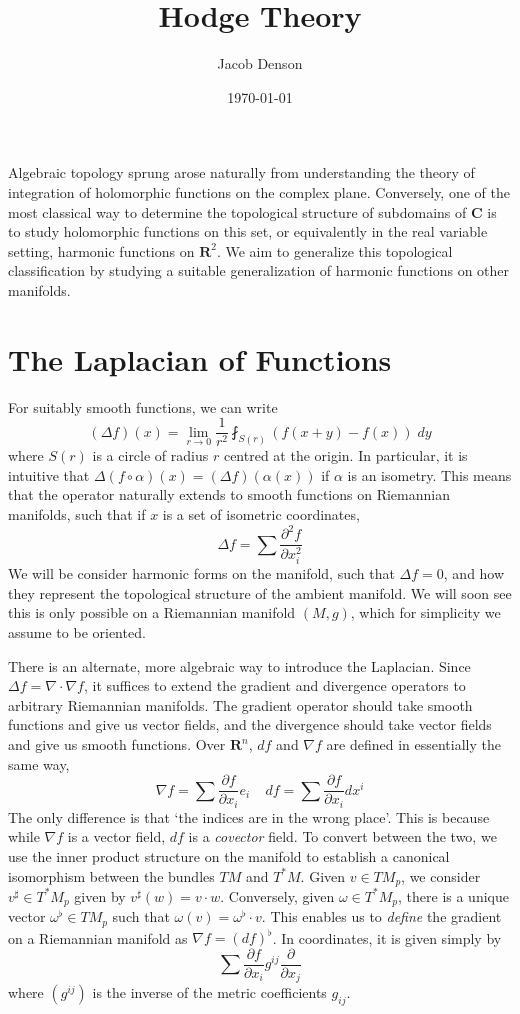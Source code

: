 \documentclass{article}
\title{Hodge Theory}
\author{Jacob Denson}
\date{\today}
\theoremstyle{plain}
\theoremstyle{remark}
\theoremstyle{definition}
\begin{document}
\maketitle

Algebraic topology sprung arose naturally from understanding the theory of integration of holomorphic functions on the complex plane. Conversely, one of the most classical way to determine the topological structure of subdomains of $\mathbf{C}$ is to study holomorphic functions on this set, or equivalently in the real variable setting, harmonic functions on $\mathbf{R}^2$. We aim to generalize this topological classification by studying a suitable generalization of harmonic functions on other manifolds.

\section{The Laplacian of Functions}

For suitably smooth functions, we can write
%
\[ (\Delta f)(x) = \lim_{r \to 0} \frac{1}{r^2} \fint_{S(r)} \left( f(x + y) - f(x) \right)\; dy \]
%
where $S(r)$ is a circle of radius $r$ centred at the origin. In particular, it is intuitive that $\Delta (f \circ \alpha)(x) = (\Delta f)(\alpha(x))$ if $\alpha$ is an isometry. This means that the operator naturally extends to smooth functions on Riemannian manifolds, such that if $x$ is a set of isometric coordinates,
%
\[ \Delta f = \sum \frac{\partial^2 f}{\partial x_i^2} \]
%
We will be consider harmonic forms on the manifold, such that $\Delta f = 0$, and how they represent the topological structure of the ambient manifold. We will soon see this is only possible on a Riemannian manifold $(M,g)$, which for simplicity we assume to be oriented.

There is an alternate, more algebraic way to introduce the Laplacian. Since $\Delta f = \nabla \cdot \nabla f$, it suffices to extend the gradient and divergence operators to arbitrary Riemannian manifolds. The gradient operator should take smooth functions and give us vector fields, and the divergence should take vector fields and give us smooth functions. Over $\mathbf{R}^n$, $df$ and $\nabla f$ are defined in essentially the same way,
%
\[ \nabla f = \sum \frac{\partial f}{\partial x_i} e_i\ \ \ \ \ df = \sum \frac{\partial f}{\partial x_i} dx^i \]
%
The only difference is that `the indices are in the wrong place'. This is because while $\nabla f$ is a vector field, $df$ is a {\it covector} field. To convert between the two, we use the inner product structure on the manifold to establish a canonical isomorphism between the bundles $TM$ and $T^*M$. Given $v \in TM_p$, we consider $v^\sharp \in T^*M_p$ given by $v^\sharp(w) = v \cdot w$. Conversely, given $\omega \in T^*M_p$, there is a unique vector $\omega^\flat \in TM_p$ such that $\omega(v) = \omega^\flat \cdot v$. This enables us to {\it define} the gradient on a Riemannian manifold as $\nabla f = (df)^\flat$. In coordinates, it is given simply by
%
\[ \sum \frac{\partial f}{\partial x_i} g^{ij} \frac{\partial}{\partial x_j} \]
%
where $(g^{ij})$ is the inverse of the metric coefficients $g_{ij}$.
\end{document}
